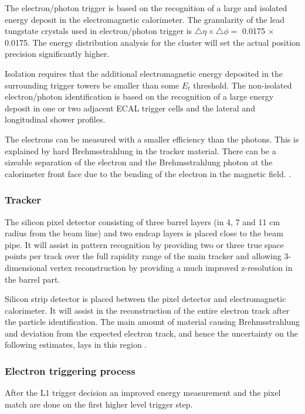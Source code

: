 \documentclass[a4paper,12pt,titlepage]{article}
\begin{document}
The electron/photon trigger is based on the recognition of a large and isolated energy deposit in the electromagnetic calorimeter. The granularity of the lead tungstate crystals used in electron/photon trigger is $\triangle\eta \times \triangle\phi = $ 0.0175 $\times$ 0.0175. The energy distribution analysis for the cluster will set the actual position precision significantly higher.

Isolation requires that the additional electromagnetic energy deposited in the surrounding trigger towers be smaller than some $E_t$ threshold. The non-isolated electron/photon identification is based on the recognition of a large energy deposit in one or two adjacent ECAL trigger cells and the lateral and longitudinal shower profiles.  

The electrons can be measured with a smaller efficiency than the photons. This is explained by hard Brehmsstrahlung in the tracker material. There can be a sizeable separation of the electron and the Brehmsstrahlung photon at the calorimeter front face due to the bending of the electron in the magnetic field. \cite{TechPropCMS, ECALDesignReport}.

\subsubsection{Tracker}
The silicon pixel detector consisting of three barrel layers (in 4, 7 and 11 \mbox{cm} radius from the beam line) and two endcap layers is placed close to the beam pipe. It will assist in pattern recognition by providing two or three true space points per track over the full rapidity range of the main tracker and allowing 3-dimensional vertex reconstruction by providing a much improved z-resolution in the barrel part.

Silicon strip detector is placed between the pixel detector and electromagnetic calorimeter. It will assist in the reconstruction of the entire electron track after the particle identification. The main amount of material causing Brehmsstrahlung and deviation from the expected electron track, and hence the uncertainty on the following estimates, lays in this region \cite{TechPropCMS, L1Trigger}.

\subsubsection{Electron triggering process}
After the L1 trigger decision an improved energy measurement and the pixel match are done on the first higher level trigger step.
 
\end{document}

